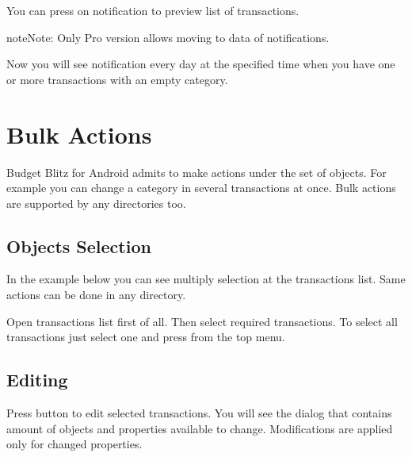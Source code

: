 \documentclass[a4paper,10pt,english]{sphinxmanual}
\begin{document}
You can press on notification to preview list of transactions.

\begin{sphinxadmonition}{note}{Note:}
Only Pro version allows moving to data of notifications.
\end{sphinxadmonition}

Now you will see notification every day at the specified time when
you have one or more transactions with an empty category.


\chapter{Bulk Actions}
\label{\detokenize{bulk-actions:bulk-actions}}\label{\detokenize{bulk-actions:chapter-bulk-actions}}\label{\detokenize{bulk-actions::doc}}
Budget Blitz for Android admits to make actions under the set of objects. For example you can change a category
in several transactions at once. Bulk actions are supported by any directories too.


\section{Objects Selection}
\label{\detokenize{bulk-actions:objects-selection}}
In the example below you can see multiply selection at the transactions list. Same actions can be done in
any directory.

\noindent{}
\noindent{}
\noindent{}

Open transactions list first of all. Then select required transactions.
To select all transactions just select one and press  from the top menu.


\section{Editing}
\label{\detokenize{bulk-actions:editing}}
Press  button to edit selected transactions. You will see the dialog that
contains amount of objects and properties available to change. Modifications are applied
only for changed properties.

\noindent{}
\noindent{}
\end{document}
